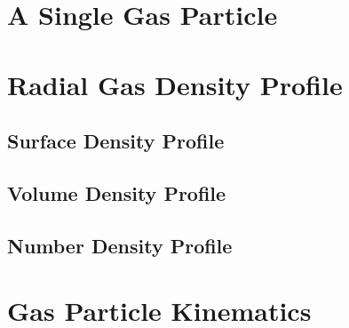 \section{A Single Gas Particle}
\section{Radial Gas Density Profile}
    \subsection{Surface Density Profile}
    \subsection{Volume Density Profile}
    \subsection{Number Density Profile}
\section{Gas Particle Kinematics}
